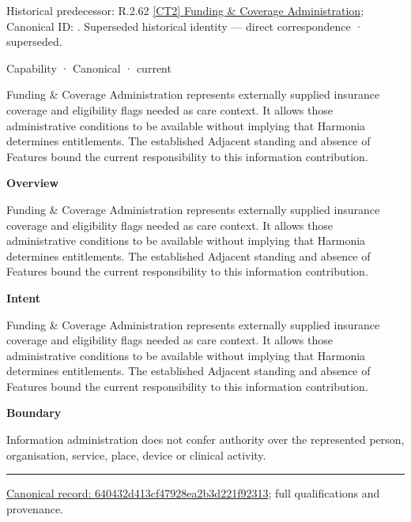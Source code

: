 {\small Historical predecessor: R.2.62 \hyperref[element:58beafcbcd084331be710eb00d27f6cf]{[CT2] Funding \& Coverage Administration}; Canonical ID: \texttt{}. Superseded historical identity — direct correspondence · superseded.}\par
\label{element:640432d413cf47928ea2b3d221f92313}
{\small Capability · Canonical · current}\par

Funding \& Coverage Administration represents externally supplied insurance coverage and eligibility flags needed as care context. It allows those administrative conditions to be available without implying that Harmonia determines entitlements. The established Adjacent standing and absence of Features bound the current responsibility to this information contribution.



\textbf{Overview}



Funding \& Coverage Administration represents externally supplied insurance coverage and eligibility flags needed as care context. It allows those administrative conditions to be available without implying that Harmonia determines entitlements. The established Adjacent standing and absence of Features bound the current responsibility to this information contribution.



\textbf{Intent}



Funding \& Coverage Administration represents externally supplied insurance coverage and eligibility flags needed as care context. It allows those administrative conditions to be available without implying that Harmonia determines entitlements. The established Adjacent standing and absence of Features bound the current responsibility to this information contribution.



\textbf{Boundary}



Information administration does not confer authority over the represented person, organisation, service, place, device or clinical activity.



\medskip\hrule\medskip

{\footnotesize \href{../../../../../../../continuum/strategy/capability/640432d413cf47928ea2b3d221f92313.md}{Canonical record: 640432d413cf47928ea2b3d221f92313}; full qualifications and provenance.}\par
